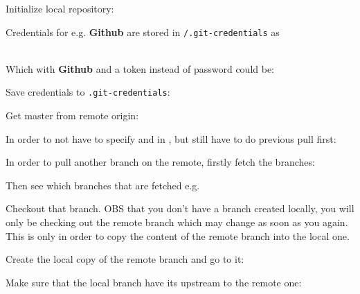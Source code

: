 
Initialize local repository:



Credentials for e.g. \textbf{Github} are stored in \texttt{\textapprox/.git-credentials} as

\\

Which with \textbf{Github} and a token instead of password could be:




Save credentials to \texttt{.git-credentials}:


Get master from remote origin:


In order to not have to specify  and  in , but still have to do previous pull first:



In order to pull another branch on the remote, firstly fetch the branches:


Then see which branches that are fetched e.g.


Checkout that branch. OBS that you don't have a branch created locally, you will only be checking out the remote branch which may change as soon as you  again. This is only in order to copy the content of the remote branch into the local one.


Create the local copy of the remote branch and go to it:


Make sure that the local branch have its upstream to the remote one:

